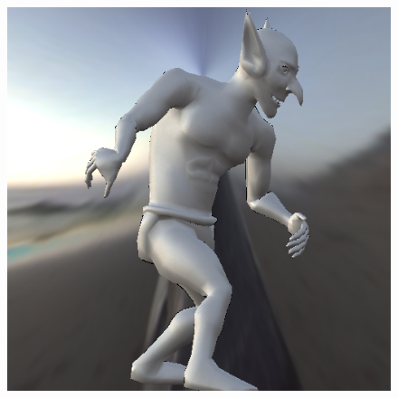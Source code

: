 \begin{figure}[H]
\endminipage\hfill
{}%
  \includegraphics[width=\linewidth]{./Imagens/brdfs/ward-goblin.png}
\endminipage
\end{figure}

